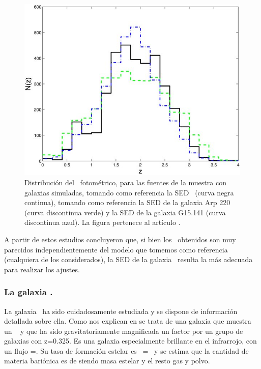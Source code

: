 \begin{figure}[htb]
    \begin{center}
         \includegraphics[width=14cm]{3_Redshift_Hatlas/simulacion_rt_distribution.jpg}
    \end{center}
    \vspace{-5mm}
    \caption{\small Distribución del \rt\ fotométrico, para las fuentes de la muestra con  galaxias simuladas, tomando como referencia la SED \smm\ (curva negra continua), tomando como referencia la SED de la galaxia Arp 220 (curva discontinua verde) y la SED de la galaxia G15.141 (curva discontinua azul). La figura pertenece al artículo \cite{article:Lapi_2011}.}
    \label{fig:sed_distrib_simulacion}
\end{figure}

A partir de estos estudios concluyeron que, si bien los \rt\ obtenidos son muy parecidos independientemente del modelo que tomemos como referencia (cualquiera de los considerados), la SED de la galaxia \smm\ resulta la más adecuada para realizar los ajustes. 

\newpage
\subsubsection{La galaxia \smm.}
La galaxia \smm\ ha sido cuidadosamente estudiada y se dispone de información detallada sobre ella. Como nos explican en \cite{article:smmj} se trata de una galaxia que muestra un \rt\  y que ha sido gravitatoriamente magnificada un factor  por un grupo de galaxias con z=0.325. Es una galaxia especialmente brillante en el infrarrojo, con un flujo =. Su tasa de formación estelar es \sfr~=~ y se estima que la cantidad de materia bariónica es de  siendo  masa estelar y el resto gas y polvo. 

